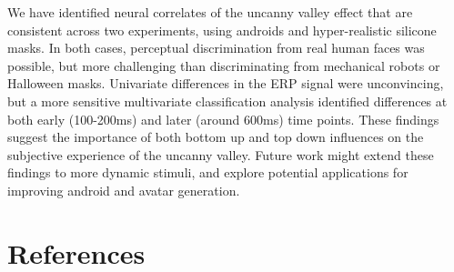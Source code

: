 \documentclass[
]{article}
\begin{document}
We have identified neural correlates of the uncanny valley effect that are consistent across two experiments, using androids and hyper-realistic silicone masks. In both cases, perceptual discrimination from real human faces was possible, but more challenging than discriminating from mechanical robots or Halloween masks. Univariate differences in the ERP signal were unconvincing, but a more sensitive multivariate classification analysis identified differences at both early (100-200ms) and later (around 600ms) time points. These findings suggest the importance of both bottom up and top down influences on the subjective experience of the uncanny valley. Future work might extend these findings to more dynamic stimuli, and explore potential applications for improving android and avatar generation.

\section*{References}\label{references}
\end{document}
